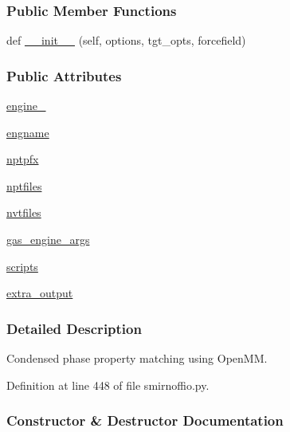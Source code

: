 \subsubsection*{Public Member Functions}
\begin{DoxyCompactItemize}
\item 
def \hyperlink{classsrc_1_1smirnoffio_1_1Liquid__SMIRNOFF_a305d7b670402a723411fbe6702029e11}{\+\_\+\+\_\+init\+\_\+\+\_\+} (self, options, tgt\+\_\+opts, forcefield)
\end{DoxyCompactItemize}
\subsubsection*{Public Attributes}
\begin{DoxyCompactItemize}
\item 
\hyperlink{classsrc_1_1smirnoffio_1_1Liquid__SMIRNOFF_aadb48b6ac9fa044e56a2e9d4b666aa0e}{engine\+\_\+}
\item 
\hyperlink{classsrc_1_1smirnoffio_1_1Liquid__SMIRNOFF_af6d479f04b0270f7b6c706f4340db54c}{engname}
\item 
\hyperlink{classsrc_1_1smirnoffio_1_1Liquid__SMIRNOFF_a5c2167329b6ed51f57310882aff8057a}{nptpfx}
\item 
\hyperlink{classsrc_1_1smirnoffio_1_1Liquid__SMIRNOFF_aa87afc0c2473faec7621c9c7d39fdf1c}{nptfiles}
\item 
\hyperlink{classsrc_1_1smirnoffio_1_1Liquid__SMIRNOFF_a377da1176a8f3318ea21449462f466b2}{nvtfiles}
\item 
\hyperlink{classsrc_1_1smirnoffio_1_1Liquid__SMIRNOFF_aa6bff96e96bd839d3561ca410c96ea69}{gas\+\_\+engine\+\_\+args}
\item 
\hyperlink{classsrc_1_1smirnoffio_1_1Liquid__SMIRNOFF_ad6ceb0f48940085a40cfffac1989b5ea}{scripts}
\item 
\hyperlink{classsrc_1_1smirnoffio_1_1Liquid__SMIRNOFF_a5b0ad9469f3f642f898da36302c35bc3}{extra\+\_\+output}
\end{DoxyCompactItemize}


\subsubsection{Detailed Description}
Condensed phase property matching using Open\+MM. 



Definition at line 448 of file smirnoffio.\+py.



\subsubsection{Constructor \& Destructor Documentation}
\mbox{\label{classsrc_1_1smirnoffio_1_1Liquid__SMIRNOFF_a305d7b670402a723411fbe6702029e11}} 

